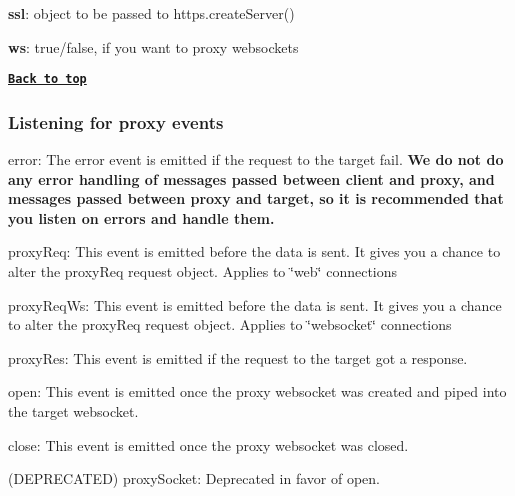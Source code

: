 \begin{DoxyItemize}
\item {\bfseries ssl}\+: object to be passed to https.\+create\+Server()
\item {\bfseries ws}\+: true/false, if you want to proxy websockets
\end{DoxyItemize}

{\bfseries \href{#table-of-contents}{\tt Back to top}}

\subsubsection*{Listening for proxy events}


\begin{DoxyItemize}
\item {\ttfamily error}\+: The error event is emitted if the request to the target fail. {\bfseries We do not do any error handling of messages passed between client and proxy, and messages passed between proxy and target, so it is recommended that you listen on errors and handle them.}
\item {\ttfamily proxy\+Req}\+: This event is emitted before the data is sent. It gives you a chance to alter the proxy\+Req request object. Applies to \char`\"{}web\char`\"{} connections
\item {\ttfamily proxy\+Req\+Ws}\+: This event is emitted before the data is sent. It gives you a chance to alter the proxy\+Req request object. Applies to \char`\"{}websocket\char`\"{} connections
\item {\ttfamily proxy\+Res}\+: This event is emitted if the request to the target got a response.
\item {\ttfamily open}\+: This event is emitted once the proxy websocket was created and piped into the target websocket.
\item {\ttfamily close}\+: This event is emitted once the proxy websocket was closed.
\item (D\+E\+P\+R\+E\+C\+A\+T\+ED) {\ttfamily proxy\+Socket}\+: Deprecated in favor of {\ttfamily open}.
\end{DoxyItemize}



